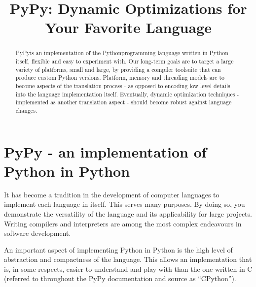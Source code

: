\documentclass[a4paper,11pt,english]{article}
\title{PyPy: Dynamic Optimizations for Your Favorite Language}
\newlength{\locallinewidth}
\begin{document}
\maketitle


\setlength{\locallinewidth}{\linewidth}
\begin{abstract}
PyPy\footnotemark[1] is an implementation of the Python\footnotemark[2] programming language written in
Python itself, flexible and easy to experiment with.  Our long-term goals are
to target a large variety of platforms, small and large, by providing a
compiler toolsuite that can produce custom Python versions.  Platform, memory
and threading models are to become aspects of the translation process - as
opposed to encoding low level details into the language implementation itself.
Eventually, dynamic optimization techniques - implemented as another
translation aspect - should become robust against language changes.
\end{abstract}


\hypertarget{pypy-an-implementation-of-python-in-python}{}
\section{PyPy - an implementation of Python in Python}

It has become a tradition in the development of computer languages to
implement each language in itself.  This serves many purposes. By doing so,
you demonstrate the versatility of the language and its applicability for
large projects.  Writing compilers and interpreters are among the most
complex endeavours in software development.

An important aspect of implementing Python in Python is the high level of
abstraction and compactness of the language. This allows an implementation
that is, in some respects, easier to understand and play with than the one
written in C (referred to throughout the PyPy documentation and source as
``CPython''\footnotemark[3]).
\end{document}
